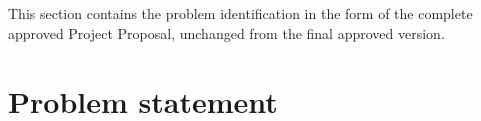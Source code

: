 
This section contains the problem identification in the form of the complete
approved Project Proposal, unchanged from the final approved version.

\newpage

\setcounter{section}{0}



%

{


\section{Problem statement}

}
